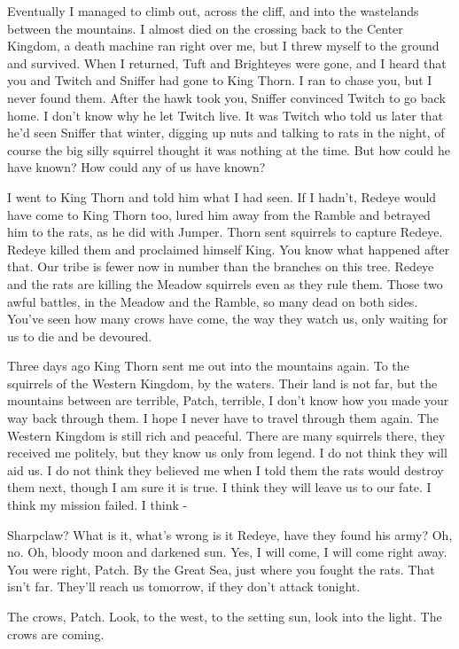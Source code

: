 \documentclass[11pt]{article}
\begin{document}
 Eventually I managed to climb out, across the cliff, and into the wastelands between the mountains. I almost died on the crossing back to the Center Kingdom, a death machine ran right over me, but I threw myself to the ground and survived. When I returned, Tuft and Brighteyes were gone, and I heard that you and Twitch and Sniffer had gone to King Thorn. I ran to chase you, but I never found them. After the hawk took you, Sniffer convinced Twitch to go back home. I don't know why he let Twitch live. It was Twitch who told us later that he'd seen Sniffer that winter, digging up nuts and talking to rats in the night, of course the big silly squirrel thought it was nothing at the time. But how could he have known? How could any of us have known?\par
 I went to King Thorn and told him what I had seen. If I hadn't, Redeye would have come to King Thorn too, lured him away from the Ramble and betrayed him to the rats, as he did with Jumper. Thorn sent squirrels to capture Redeye. Redeye killed them and proclaimed himself King. You know what happened after that. Our tribe is fewer now in number than the branches on this tree. Redeye and the rats are killing the Meadow squirrels even as they rule them. Those two awful battles, in the Meadow and the Ramble, so many dead on both sides. You've seen how many crows have come, the way they watch us, only waiting for us to die and be devoured.\par
 Three days ago King Thorn sent me out into the mountains again. To the squirrels of the Western Kingdom, by the waters. Their land is not far, but the mountains between are terrible, Patch, terrible, I don't know how you made your way back through them. I hope I never have to travel through them again. The Western Kingdom is still rich and peaceful. There are many squirrels there, they received me politely, but they know us only from legend. I do not think they will aid us. I do not think they believed me when I told them the rats would destroy them next, though I am sure it is true. I think they will leave us to our fate. I think my mission failed. I think -\par
 Sharpclaw? What is it, what's wrong %
 is it Redeye, have they found his army? Oh, no. Oh, bloody moon and darkened sun. Yes, I will come, I will come right away. You were right, Patch. By the Great Sea, just where you fought the rats. That isn't far. They'll reach us tomorrow, if they don't attack tonight.\par
 The crows, Patch. Look, to the west, to the setting sun, look into the light. The crows are coming.\par
\end{document}
